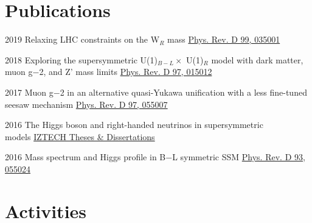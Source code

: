 \documentclass[]{friggeri-cv}
\begin{document}
\section{Publications}

\begin{entrylist}
	
	\entry
	{2019}
	{Relaxing LHC constraints on the W$_R$ mass}
	{\href{https://journals.aps.org/prd/abstract/10.1103/PhysRevD.99.035001}{Phys. Rev. D 99, 035001}} 
	
	
	\entry
	{2018}
	{Exploring the supersymmetric U(1)$_{B-L} \times$ U(1)$_R$ model with dark matter, muon g−2, and Z' mass limits}
	{\href{https://journals.aps.org/prd/abstract/10.1103/PhysRevD.97.015012}{Phys. Rev. D 97, 015012}} 
	
	\entry
	{2017}
	{Muon g−2 in an alternative quasi-Yukawa unification with a less fine-tuned seesaw mechanism}
	{\href{http://journals.aps.org/prd/abstract/10.1103/PhysRevD.97.055007}{Phys. Rev. D 97, 055007}} 
	
	\entry
	{2016}
	{The Higgs boson and right-handed neutrinos in supersymmetric \\ models}
	{\href{http://openaccess.iyte.edu.tr/xmlui/handle/11147/2842}{IZTECH Theses \& Dissertations}} 
	
	\entry
	{2016}
	{Mass spectrum and Higgs profile in B−L symmetric SSM}
	{\href{http://journals.aps.org/prd/abstract/10.1103/PhysRevD.93.055024}{Phys. Rev. D 93, 055024}} 
	
\end{entrylist}

\section{Activities}
\end{document}
